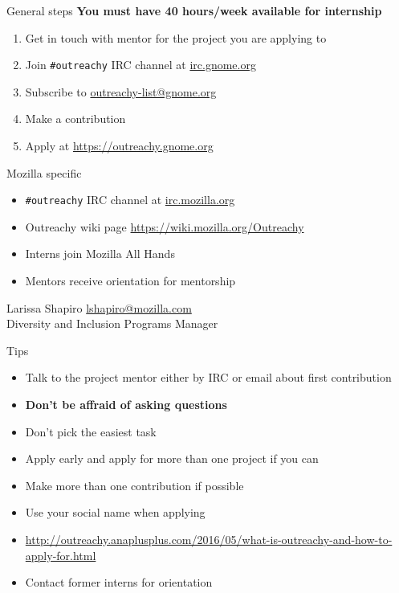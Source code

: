 \documentclass[pdf]{beamer}
\begin{document}
\begin{frame}{General steps}
  \textbf{You must have 40 hours/week available for internship}

  \begin{enumerate}
    \item Get in touch with mentor for the project you are applying to
    \item Join \texttt{\#outreachy} IRC channel at \url{irc.gnome.org}
    \item Subscribe to \href{mailto:outreachy-list@gnome.org}{outreachy-list@gnome.org}
    \item Make a contribution
    \item Apply at \url{https://outreachy.gnome.org}
  \end{enumerate}
\end{frame}

\begin{frame}{Mozilla specific}
  \begin{itemize}
    \item \texttt{\#outreachy} IRC channel at \url{irc.mozilla.org}
    \item Outreachy wiki page \url{https://wiki.mozilla.org/Outreachy}
    \item Interns join Mozilla All Hands
    \item Mentors receive orientation for mentorship
  \end{itemize}

  \begin{center}
    Larissa Shapiro \href{mailto:lshapiro@mozilla.com}{lshapiro@mozilla.com}\\
    Diversity and Inclusion Programs Manager
  \end{center}
\end{frame}

\begin{frame}{Tips}
  \begin{itemize}
    \item Talk to the project mentor either by IRC or email about first contribution
    \item \textbf{Don't be affraid of asking questions}
    \item Don't pick the easiest task
    \item Apply early and apply for more than one project if you can
    \item Make more than one contribution if possible
    \item Use your social name when applying
    \item \url{http://outreachy.anaplusplus.com/2016/05/what-is-outreachy-and-how-to-apply-for.html}
    \item Contact former interns for orientation
  \end{itemize}
\end{frame}
\end{document}
